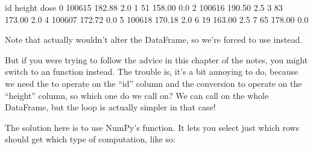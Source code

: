 \documentclass[letterpaper,10pt,english]{sphinxmanual}
\begin{document}
\begin{sphinxVerbatim}[commandchars=\\\{\}]
  

   
     \PYG{p}{[}\PYG{p}{]}    
        \PYG{p}{[}\PYG{p}{]}  
\end{sphinxVerbatim}

\begin{sphinxVerbatim}[commandchars=\\\{\}]
       id  height  dose
0  100615  182.88   2.0
1      51  158.00   0.0
2  100616  190.50   2.5
3      83  173.00   2.0
4  100607  172.72   0.0
5  100618  170.18   2.0
6      19  163.00   2.5
7      65  178.00   0.0
\end{sphinxVerbatim}

Note that  actually wouldn’t alter the DataFrame, so we’re forced to use  instead.

But if you were trying to follow the advice in this chapter of the notes, you might switch to an  function instead.  The trouble is, it’s a bit annoying to do, because we need the  to operate on the “id” column and the conversion to operate on the “height” column, so which one do we call  on?  We can call  on the whole DataFrame, but the loop is actually simpler in that case!

The solution here is to use NumPy’s  function.  It lets you select just which rows should get which type of computation, like so:
\end{document}
